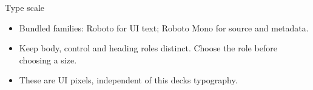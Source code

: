 \begin{standardframe}{Type scale}

\begin{itemize}
\item Bundled families: Roboto for UI text; Roboto Mono for source and metadata.
\item Keep body, control and heading roles distinct. Choose the role before choosing a size.
\item These are UI pixels, independent of this deck\textquotesingle s typography.
\end{itemize}
\end{standardframe}

